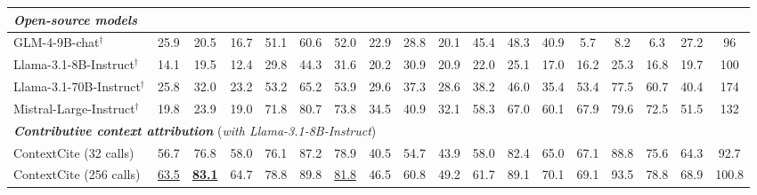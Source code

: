 \begin{table*}[t]
{\begin{tabular}{l|ccc|ccc|ccc|ccc|ccc|c|c}
			\multicolumn{18}{l}{\textit{\bf Open-source models }}                                                                                                                                                                                                                                                                                   \\\midrule
			GLM-4-9B-chat$^\dagger$          & 25.9                                    & 20.5                                  & 16.7                              & 51.1                              & 60.6                               & 52.0     & 22.9         & 28.8 & 20.1 & 45.4 & 48.3 & 40.9 & 5.7  & 8.2  & 6.3  & 27.2   & 96         \\
			Llama-3.1-8B-Instruct$^\dagger$  & 14.1                                    & 19.5                                  & 12.4                              & 29.8                              & 44.3                               & 31.6     & 20.2         & 30.9 & 20.9 & 22.0 & 25.1 & 17.0 & 16.2 & 25.3 & 16.8 & 19.7   & 100        \\
			Llama-3.1-70B-Instruct$^\dagger$ & 25.8                                    & 32.0                                  & 23.2                              & 53.2                              & 65.2                               & 53.9     & 29.6         & 37.3 & 28.6 & 38.2 & 46.0 & 35.4 & 53.4 & 77.5 & 60.7 & 40.4   & 174        \\
			Mistral-Large-Instruct$^\dagger$ & 19.8                                    & 23.9                                  & 19.0                              & 71.8                              & 80.7                               & 73.8     & 34.5         & 40.9 & 32.1 & 58.3 & 67.0 & 60.1 & 67.9 & 79.6 & 72.5 & 51.5   & 132        \\
			\midrule

			\multicolumn{18}{l}{\textit{\bf Contributive context attribution} (\textit{with Llama-3.1-8B-Instruct})}                                                                                                                                                                                                                                \\\midrule
			ContextCite (32 calls)           & 56.7                                    & 76.8                                  & 58.0                              & 76.1                              & 87.2                               & 78.9     & 40.5         & 54.7 & 43.9 & 58.0 & 82.4 & 65.0 & 67.1 & 88.8 & 75.6 & 64.3   & 92.7       \\
			ContextCite (256 calls)          & \underline{63.5}                        & \underline{\bf 83.1}                  & 64.7                              & 78.8                              & 89.8                       & \underline{81.8} & 46.5         & 60.8 & 49.2 & 61.7 & 89.1 & 70.1 & 69.1 & 93.5 & 78.8 & 68.9   & 100.8      \\
			\midrule


\end{tabular}}
\end{table*}
